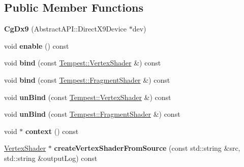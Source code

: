 \subsection*{Public Member Functions}
\begin{DoxyCompactItemize}
\item 
\hypertarget{class_tempest_1_1_cg_dx9_ae00dd2a61f6ee4eac03c4fab4defd0ea}{{\bfseries Cg\+Dx9} (Abstract\+A\+P\+I\+::\+Direct\+X9\+Device $\ast$dev)}\label{class_tempest_1_1_cg_dx9_ae00dd2a61f6ee4eac03c4fab4defd0ea}

\item 
\hypertarget{class_tempest_1_1_cg_dx9_ac10056402c26eac8911b532b838008b1}{void {\bfseries enable} () const }\label{class_tempest_1_1_cg_dx9_ac10056402c26eac8911b532b838008b1}

\item 
\hypertarget{class_tempest_1_1_cg_dx9_ad0baf34ac3ac1e4b82805cde272c0425}{void {\bfseries bind} (const \hyperlink{class_tempest_1_1_vertex_shader}{Tempest\+::\+Vertex\+Shader} \&) const }\label{class_tempest_1_1_cg_dx9_ad0baf34ac3ac1e4b82805cde272c0425}

\item 
\hypertarget{class_tempest_1_1_cg_dx9_ad3196b4941c97f5058034b31b97dfa41}{void {\bfseries bind} (const \hyperlink{class_tempest_1_1_fragment_shader}{Tempest\+::\+Fragment\+Shader} \&) const }\label{class_tempest_1_1_cg_dx9_ad3196b4941c97f5058034b31b97dfa41}

\item 
\hypertarget{class_tempest_1_1_cg_dx9_a54890451df72d9ab4ca6c70b3683d112}{void {\bfseries un\+Bind} (const \hyperlink{class_tempest_1_1_vertex_shader}{Tempest\+::\+Vertex\+Shader} \&) const }\label{class_tempest_1_1_cg_dx9_a54890451df72d9ab4ca6c70b3683d112}

\item 
\hypertarget{class_tempest_1_1_cg_dx9_ac9b9f5f08758c0d2a556ca750370024c}{void {\bfseries un\+Bind} (const \hyperlink{class_tempest_1_1_fragment_shader}{Tempest\+::\+Fragment\+Shader} \&) const }\label{class_tempest_1_1_cg_dx9_ac9b9f5f08758c0d2a556ca750370024c}

\item 
\hypertarget{class_tempest_1_1_cg_dx9_ab39c2c66273eba2496806a76381eb741}{void $\ast$ {\bfseries context} () const }\label{class_tempest_1_1_cg_dx9_ab39c2c66273eba2496806a76381eb741}

\item 
\hypertarget{class_tempest_1_1_cg_dx9_abb2454f52bbe6c813d6da3dfc6a2a942}{\hyperlink{class_tempest_1_1_vertex_shader}{Vertex\+Shader} $\ast$ {\bfseries create\+Vertex\+Shader\+From\+Source} (const std\+::string \&src, std\+::string \&output\+Log) const }\label{class_tempest_1_1_cg_dx9_abb2454f52bbe6c813d6da3dfc6a2a942}


\end{DoxyCompactItemize}
